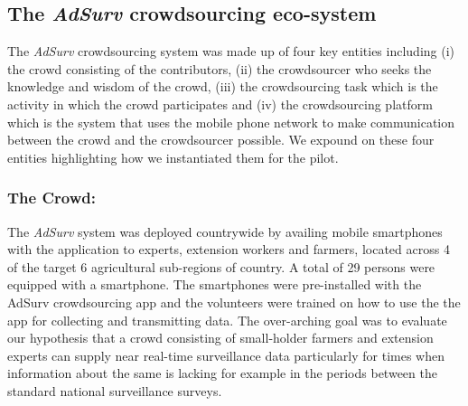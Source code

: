 \documentclass[letterpaper]{article} %
\begin{document}
\subsection{The \emph{AdSurv} crowdsourcing eco-system}
The \emph{AdSurv} crowdsourcing system was made up of four key entities including (i) the crowd consisting of the contributors, (ii) the crowdsourcer who seeks the knowledge and wisdom of the crowd, (iii) the crowdsourcing task which is the activity in which the crowd participates and (iv) the crowdsourcing platform which is the system that uses the mobile phone network to make communication between the crowd and the crowdsourcer possible. We expound on these four entities highlighting how we instantiated them for the pilot.

\subsubsection{The Crowd:}
The \emph{AdSurv} system was deployed countrywide by availing mobile smartphones with the application to experts, extension workers and farmers, located across 4 of the target 6 agricultural sub-regions of country. A total of 29 persons were equipped with a smartphone.  The smartphones were pre-installed with the AdSurv crowdsourcing app and the volunteers were trained on how to use the the app for collecting and transmitting data. The over-arching goal was to evaluate our hypothesis that a crowd consisting of small-holder farmers and extension experts can supply near real-time surveillance data particularly for times when information about the same is lacking for example in the periods between the standard national surveillance surveys.
\end{document}
